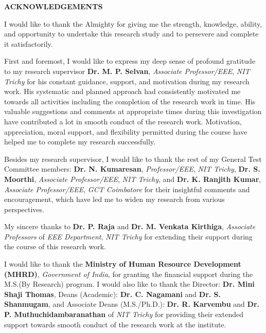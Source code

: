 {}
\centerline{\normalsize\textbf{ACKNOWLEDGEMENTS}}
\vspace{0cm}
\smallskip

I would like to thank the Almighty for giving me the strength, knowledge, ability, and opportunity to undertake this research study and to persevere and complete it satisfactorily.

First and foremost, I would like to express my deep sense of profound gratitude to my research supervisor \textbf {Dr. M. P. Selvan}, \textit{Associate Professor/EEE}, \textit{NIT Trichy} for his constant guidance, support, and motivation during my research work. His systematic and planned approach had consistently motivated me towards all activities including the completion of the research work in time. His valuable suggestions and comments at appropriate times during this investigation have contributed a lot in smooth conduct of the research work. Motivation, appreciation, moral support, and flexibility permitted during the course have helped me to complete my research successfully.

Besides my research supervisor, I would like to thank the rest of my General Test Committee members: \textbf{Dr. N. Kumaresan}, \textit{Professor/EEE}, \textit{NIT Trichy}, \textbf{Dr. S. Moorthi}, \textit{Associate Professor/EEE}, \textit{NIT Trichy}, and \textbf{Dr. K. Ranjith Kumar},\textit{ Associate Professor/EEE}, \textit{GCT Coimbatore} for their insightful comments and encouragement, which have led me to widen my research from various perspectives.

My sincere thanks to \textbf{Dr. P. Raja} and \textbf{Dr. M. Venkata Kirthiga}, \textit{Associate Professors} of \textit{EEE Department}, \textit{NIT Trichy} for extending their support during the course of this research work.

I would like to thank the \textbf{Ministry of Human Resource Development (MHRD)}, \textit{Government of India}, for granting the financial support during the M.S.(By Research) program. I would also like to thank the Director: \textbf{Dr. Mini Shaji Thomas}, Deans (Academic): \textbf{Dr. C. Nagamani} and \textbf{Dr. S. Shanmugam}, and Associate Deans (M.S./Ph.D.): \textbf{Dr. R. Karvembu} and \textbf{Dr. P. Muthuchidambaranathan}  of  \textit{NIT Trichy} for providing their extended support towards smooth conduct of the research work at the institute. 

